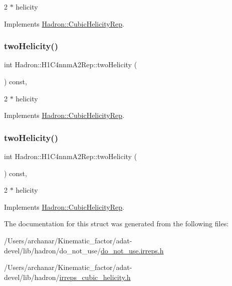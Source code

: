 2 $\ast$ helicity 

Implements \mbox{\hyperlink{structHadron_1_1CubicHelicityRep_af507aa56fc2747eacc8cb6c96db31ecc}{Hadron\+::\+Cubic\+Helicity\+Rep}}.

\mbox{\label{structHadron_1_1H1C4nnmA2Rep_ade831b200fa8211a8f09dd6e7e80692a}} 
\subsubsection{\texorpdfstring{twoHelicity()}{twoHelicity()}\hspace{0.1cm}{\footnotesize\ttfamily [2/3]}}
{\footnotesize\ttfamily int Hadron\+::\+H1\+C4nnm\+A2\+Rep\+::two\+Helicity (\begin{DoxyParamCaption}{ }\end{DoxyParamCaption}) const\hspace{0.3cm}{\ttfamily [inline]}, {\ttfamily [virtual]}}

2 $\ast$ helicity 

Implements \mbox{\hyperlink{structHadron_1_1CubicHelicityRep_af507aa56fc2747eacc8cb6c96db31ecc}{Hadron\+::\+Cubic\+Helicity\+Rep}}.

\mbox{\label{structHadron_1_1H1C4nnmA2Rep_ade831b200fa8211a8f09dd6e7e80692a}} 
\subsubsection{\texorpdfstring{twoHelicity()}{twoHelicity()}\hspace{0.1cm}{\footnotesize\ttfamily [3/3]}}
{\footnotesize\ttfamily int Hadron\+::\+H1\+C4nnm\+A2\+Rep\+::two\+Helicity (\begin{DoxyParamCaption}{ }\end{DoxyParamCaption}) const\hspace{0.3cm}{\ttfamily [inline]}, {\ttfamily [virtual]}}

2 $\ast$ helicity 

Implements \mbox{\hyperlink{structHadron_1_1CubicHelicityRep_af507aa56fc2747eacc8cb6c96db31ecc}{Hadron\+::\+Cubic\+Helicity\+Rep}}.



The documentation for this struct was generated from the following files\+:\begin{DoxyCompactItemize}
\item 
/\+Users/archanar/\+Kinematic\+\_\+factor/adat-\/devel/lib/hadron/do\+\_\+not\+\_\+use/\mbox{\hyperlink{adat-devel_2lib_2hadron_2do__not__use_2do__not__use_8irreps_8h}{do\+\_\+not\+\_\+use.\+irreps.\+h}}\item 
/\+Users/archanar/\+Kinematic\+\_\+factor/adat-\/devel/lib/hadron/\mbox{\hyperlink{adat-devel_2lib_2hadron_2irreps__cubic__helicity_8h}{irreps\+\_\+cubic\+\_\+helicity.\+h}}\end{DoxyCompactItemize}
